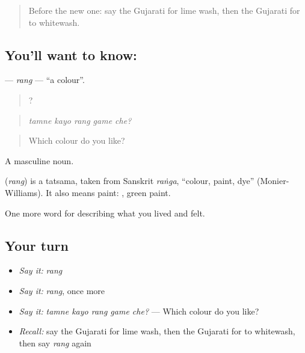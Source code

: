 \label{lesson:GU-C516-rang}



\begin{quote}
Before the new one: say the Gujarati for lime wash, then the Gujarati for to whitewash.
\end{quote}

\subsection*{You'll want to know: }
\textbf{} — \emph{rang} — \textquotedblleft{}a colour\textquotedblright{}.

\begin{quote}
    ?
\end{quote}

\begin{quote}
\emph{tamne kayo rang game che?}
\end{quote}

\begin{quote}
Which colour do you like?
\end{quote}

A masculine noun.

\begin{cousinweb}
\textbf{} (\emph{rang}) is a tatsama, taken from Sanskrit \emph{raṅga}, \textquotedblleft{}colour, paint, dye\textquotedblright{} (Monier-Williams). It also means paint: \textbf{ }, green paint.
\end{cousinweb}

\begin{grammarlens}[title={What you've built}]
One more word for describing what you lived and felt.
\end{grammarlens}

\subsection*{Your turn}
\begin{itemize}
\raggedright
  \item \emph{Say it:} \emph{rang}
  \item \emph{Say it:} \emph{rang}, once more
  \item \emph{Say it:} \emph{tamne kayo rang game che?} — Which colour do you like?
  \item \emph{Recall:} say the Gujarati for lime wash, then the Gujarati for to whitewash, then say \emph{rang} again
\end{itemize}

